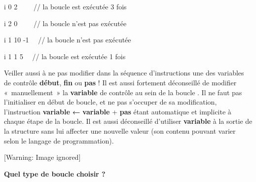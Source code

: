 {\sffamily
{} i  0  2
 \ \ \ \ // la boucle est exécutée 3 fois}

{\sffamily
{} i  2  0
 \ \ \ \ // la boucle n'est pas
exécutée}

{\sffamily
{} i  1  10
 -1  \ \ // la boucle
n'est pas exécutée}

{\sffamily
{} i  1  1
 5  \ \ // la boucle est
exécutée 1 fois}

{
Veiller aussi à ne pas modifier dans la séquence d’instructions une des
variables de contrôle \textbf{début}, \textbf{fin} ou \textbf{pas} ! Il
est aussi fortement déconseillé de modifier «~manuellement~» la
\textbf{variable} de contrôle au sein de la boucle
. Il ne faut pas l’initialiser en début de boucle,
et ne pas s’occuper de sa modification, l’instruction \textbf{variable}
{\textsf{\textbf{←}}} \textbf{variable} +
\textbf{pas} étant automatique et implicite à chaque étape de la
boucle. Il est aussi déconseillé d’utiliser \textbf{variable} à la
sortie de la structure  sans lui affecter une
nouvelle valeur (son contenu pouvant varier selon le langage de
programmation).}

\begin{center}
 [Warning: Image ignored] %

\end{center}
{\sffamily\bfseries
Quel type de boucle choisir ?}

{
}




